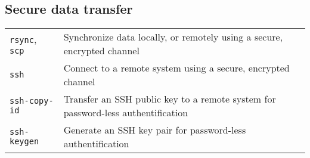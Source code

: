\documentclass[10pt]{article}
\begin{document}
\begin{multicols}{2}
\section{Secure data transfer}
\begin{tabular}{ p{2.5cm} p{8.5cm} }
  \hline
  \texttt{rsync}, \texttt{scp} & Synchronize data locally, or remotely \newline using a secure, encrypted channel \\
  \rowcolor{Gray}
  \texttt{ssh} & Connect to a remote system using a \newline secure, encrypted channel\\
  \texttt{ssh-copy-id} & Transfer an SSH public key to a remote system for password-less authentification\\
  \rowcolor{Gray}
  \texttt{ssh-keygen} & Generate an SSH key pair for password-less authentification\\
  \hline
\end{tabular}

\columnbreak


\end{multicols}
\end{document}
